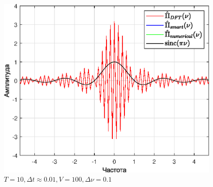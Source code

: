 \documentclass[a4paper]{article}
\begin{document}
\begin{figure}[H]
\begin{minipage}{0.5\textwidth}
        \centering \includegraphics[width=\textwidth]{graphs/3/T_10_dt_0.01001_V_100_dv_0.1/fourier_combined_all.eps}
        \caption{$T = 10, \Delta t \approx 0.01, V = 100, \Delta \nu = 0.1$}
    \end{minipage}\hfill
\end{figure}\noindent\
\end{document}
